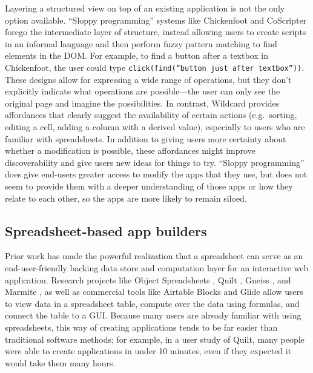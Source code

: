 \documentclass[english,submission]{programming}
\begin{document}
Layering a structured view on top of an existing application is not the
only option available. ``Sloppy programming'' systems like Chickenfoot
\autocite{bolin2005} and CoScripter \autocite{leshed2008} forego the
intermediate layer of structure, instead allowing users to create
scripts in an informal language and then perform fuzzy pattern matching
to find elements in the DOM. For example, to find a button after a
textbox in Chickenfoot, the user could type
\texttt{click(find(“button\ just\ after\ textbox”))}. These designs
allow for expressing a wide range of operations, but they don't
explicitly indicate what operations are possible---the user can only see
the original page and imagine the possibilities. In contrast, Wildcard
provides affordances that clearly suggest the availability of certain
actions (e.g.~sorting, editing a cell, adding a column with a derived
value), especially to users who are familiar with spreadsheets. In
addition to giving users more certainty about whether a modification is
possible, these affordances might improve discoverability and give users
new ideas for things to try. ``Sloppy programming'' does give end-users
greater access to modify the apps that they use, but does not seem to
provide them with a deeper understanding of those apps or how they
relate to each other, so the apps are more likely to remain siloed.

\hypertarget{spreadsheet-based-app-builders}{%
\subsection{Spreadsheet-based app
builders}\label{spreadsheet-based-app-builders}}

Prior work has made the powerful realization that a spreadsheet can
serve as an end-user-friendly backing data store and computation layer
for an interactive web application. Research projects like Object
Spreadsheets \autocite{mccutchen2016}, Quilt \autocite{benson2014},
Gneiss \autocite{chang2014}, and Marmite \autocite{wong2007}, as well as
commercial tools like Airtable Blocks \autocite{zotero-79} and Glide
\autocite{zotero-81} allow users to view data in a spreadsheet table,
compute over the data using formulas, and connect the table to a GUI.
Because many users are already familiar with using spreadsheets, this
way of creating applications tends to be far easier than traditional
software methods; for example, in a user study of Quilt, many people
were able to create applications in under 10 minutes, even if they
expected it would take them many hours.
\end{document}
